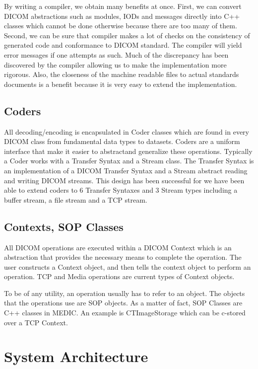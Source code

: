 \documentclass[a4paper,10pt]{article}
\begin{document}
By writing a compiler, we obtain many benefits at once. First, we can
convert DICOM abstractions such as modules, IODs and messages directly
into C++ classes which cannot be done otherwise because there are too
many of them. Second, we can be sure that compiler makes a lot of
checks on the consistency of generated code and conformance to DICOM
standard. The compiler will yield error messages if one attempts as
such. Much of the discrepancy has been discovered by the compiler
allowing us to make the implementation more rigorous. Also, the
closeness of the machine readable files to actual standards documents
is a benefit because it is very easy to extend the implementation.

\subsection{Coders}

All decoding/encoding is encapsulated in Coder classes which are
found in every DICOM class from fundamental data types to datasets.
Coders are a uniform interface that make it easier to abstractand
generalize these operations. Typically a Coder works with a Transfer
Syntax and a Stream class. The Transfer Syntax is an implementation
of a DICOM Transfer Syntax and a Stream abstract reading and writing
DICOM streams. This design has been successful for we have been able
to extend coders to 6 Transfer Syntaxes and 3 Stream types including
a buffer stream, a file stream and a TCP stream.

\subsection{Contexts, SOP Classes}

All DICOM operations are executed within a DICOM Context which is
an abstraction that provides the necessary means to complete the
operation. The user constructs a Context object, and then tells the
context object to perform an operation. TCP and Media operations are
current types of Context objects.

To be of any utility, an operation usually has to refer to an object.
The objects that the operations use are SOP objects. As a matter of
fact, SOP Classes are C++ classes in MEDIC. An example is
CTImageStorage which can be c-stored over a TCP Context.

\section{System Architecture}
\end{document}

